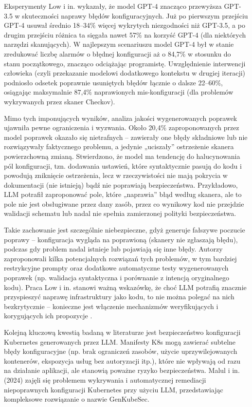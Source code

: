 Eksperymenty Low i in. wykazały, że model GPT-4 znacząco przewyższa GPT-3.5 w skuteczności naprawy błędów konfiguracyjnych. Już po pierwszym przejściu GPT-4 usuwał średnio 18–34\% więcej wykrytych niezgodności niż GPT-3.5, a po drugim przejściu różnica ta sięgała nawet 57\% na korzyść GPT-4 (dla niektórych narzędzi skanujących). W najlepszym scenariuszu model GPT-4 był w stanie zredukować liczbę alarmów o błędnej konfiguracji aż o 84,7\% w stosunku do stanu początkowego, znacząco odciążając programistę. Uwzględnienie interwencji człowieka (czyli przekazanie modelowi dodatkowego kontekstu w drugiej iteracji) podniosło odsetek poprawnie usuniętych błędów łącznie o dalsze 22–60\%, osiągając maksymalnie 87,4\% naprawionych mis-konfiguracji (dla problemów wykrywanych przez skaner Checkov).

Mimo tych imponujących wyników, analiza jakości wygenerowanych poprawek ujawniła pewne ograniczenia i wyzwania. Około 20,4\% zaproponowanych przez model poprawek okazało się nietrafnych – zawierały one błędy składniowe lub nie rozwiązywały faktycznego problemu, a jedynie „uciszały” ostrzeżenie skanera powierzchowną zmianą. Stwierdzono, że model ma tendencję do halucynowania pól konfiguracji, tzn. dodawania ustawień, które syntaktycznie pasują do kodu i powodują zniknięcie ostrzeżenia, lecz w rzeczywistości nie mają pokrycia w dokumentacji (nie istnieją) bądź nie poprawiają bezpieczeństwa. Przykładowo, LLM potrafił zaproponować pole, które „naprawia” błąd według skanera, ale to pole nie jest obsługiwane przez dany zasób, przez co wynikowy kod nie przejdzie walidacji schematu lub nadal nie spełnia zamierzonej polityki bezpieczeństwa.

Takie zachowanie jest szczególnie niebezpieczne, gdyż generuje fałszywe poczucie poprawy – konfiguracja wygląda na poprawioną (skanery nie zgłaszają błędu), podczas gdy problem nadal istnieje lub pojawiają się inne błędy. Autorzy zaproponowali kilka potencjalnych rozwiązań tych problemów, w tym bardziej restrykcyjne prompty oraz dodatkowe automatyczne testy wygenerowanych poprawek (np. walidacja syntaktyczna i porównanie z intencją oryginalnego kodu). Praca Low i in. stanowi ważną wskazówkę, że choć LLM potrafią znacznie przyspieszyć naprawę infrastruktury jako kodu, to nie można polegać na nich bezkrytycznie – konieczne jest włączenie mechanizmów weryfikujących i korygujących ich propozycje \cite{low_repairing_2024}.

Kolejną kluczową kwestią badaną w literaturze jest bezpieczeństwo konfiguracji Kubernetes generowanych przez LLM. Manifesty K8s mogą zawierać subtelne błędy konfiguracyjne (np. brak ograniczeń zasobów, użycie uprzywilejowanych kontenerów, ekspozycja usług bez autoryzacji itp.), które nie wpływają od razu na działanie aplikacji, ale stanowią poważne ryzyko bezpieczeństwa. Malul i in. (2024) zajęli się problemem wykrywania i automatycznej remediacji niepoprawnych konfiguracji Kubernetes przy użyciu LLM, przedstawiając kompleksowe rozwiązanie o nazwie GenKubeSec.

